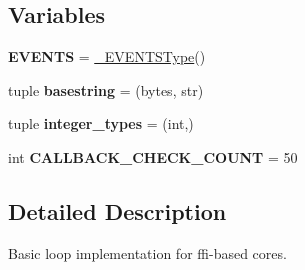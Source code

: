 \subsection*{Variables}
\begin{DoxyCompactItemize}
\item 
\mbox{\label{namespacegevent_1_1__ffi_1_1loop_a674c8924d906fcbf874aeea3d37ecd92}} 
{\bfseries E\+V\+E\+N\+TS} = \hyperlink{classgevent_1_1__ffi_1_1loop_1_1___e_v_e_n_t_s_type}{\+\_\+\+E\+V\+E\+N\+T\+S\+Type}()
\item 
\mbox{\label{namespacegevent_1_1__ffi_1_1loop_aea503f9a52c89a98f2f793f07043c2bb}} 
tuple {\bfseries basestring} = (bytes, str)
\item 
\mbox{\label{namespacegevent_1_1__ffi_1_1loop_a888b635867b4af6b9eea237ee549a64a}} 
tuple {\bfseries integer\+\_\+types} = (int,)
\item 
\mbox{\label{namespacegevent_1_1__ffi_1_1loop_aedc8783fc4b8ceb17e756edb86fbcdf4}} 
int {\bfseries C\+A\+L\+L\+B\+A\+C\+K\+\_\+\+C\+H\+E\+C\+K\+\_\+\+C\+O\+U\+NT} = 50
\end{DoxyCompactItemize}


\subsection{Detailed Description}
\begin{DoxyVerb}Basic loop implementation for ffi-based cores.
\end{DoxyVerb}
 